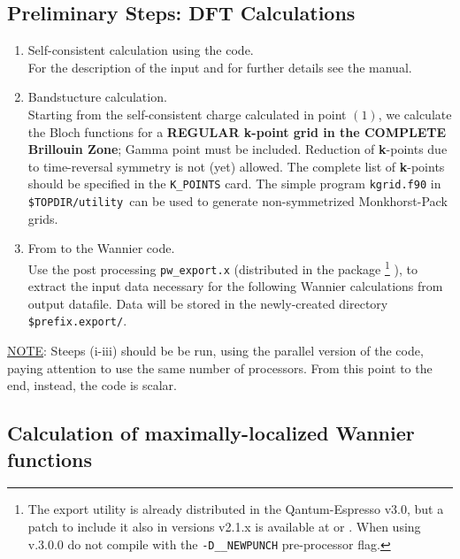 \subsection{Preliminary Steps: DFT
Calculations}\label{subsection:run_dft}
\renewcommand{\theenumi}{\roman{enumi}}
\renewcommand{\labelenumi}{\theenumi)}
\begin{enumerate}
%
\item Self-consistent calculation using the \PWSCF code.\\
      \noindent For the description of the input and for further details see the \PWSCF
      manual.
\item Bandstucture calculation.\\
      \noindent  Starting from the self-consistent charge
      calculated in point $(1)$, we calculate the Bloch functions for a
      {\bf REGULAR {\bf k}-point grid in the COMPLETE Brillouin Zone}; Gamma point
      must be included. Reduction of \textbf{k}-points due to time-reversal 
      symmetry is not (yet) allowed. The complete list of 
      \textbf{k}-points should be specified in the {\tt K\_POINTS} card. 
      The simple program
      {\tt kgrid.f90} in {\tt \$TOPDIR/utility }can be used to generate non-symmetrized 
      Monkhorst-Pack grids.
\item From \PWSCF to the Wannier code.\\
      \noindent Use the post processing
      {\tt pw\_export.x} (distributed in the \PWSCF package 
      \footnote{The export utility is already distributed in the 
      Qantum-Espresso v3.0, but a patch to include it also in versions v2.1.x is
      available at \WANTURL{} or \PWSCFURL{}. When using v.3.0.0 do not compile with
      the {\tt -D\_\_NEWPUNCH} pre-processor flag.} 
      ),
      to extract the input data necessary for the following Wannier
      calculations
      from \PWSCF output datafile. Data will be stored in the
      newly-created directory {\tt \$prefix.export/}.
\end{enumerate}

\noindent \underline{NOTE}: Steeps (i-iii) should be be run, using the
parallel version of the code, paying attention to use the same
number of processors. From this point to the end, instead, the
code is scalar.

\subsection {Calculation of maximally-localized Wannier
functions}\label{subsection:run_wannier}

